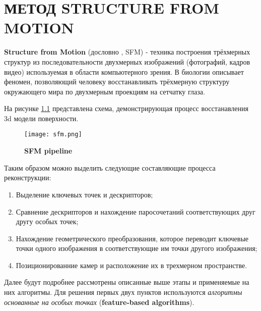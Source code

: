 \chapter{МЕТОД STRUCTURE FROM MOTION}

\textbf{Structure from Motion} (дословно , SFM) - техника построения трёхмерных структур из последовательности двухмерных изображений (фотографий, кадров видео) используемая в области компьютерного зрения. В биологии описывает феномен, позволяющий человеку восстанавливать трёхмерную структуру окружающего мира по двухмерным проекциям на сетчатку глаза.

На рисунке \ref{fig:sfm} представлена схема, демонстрирующая процесс восстанавления 3d модели поверхности.

\begin{figure}[h]
    \centering
    \texttt{[image: sfm.png]}
    \caption{\textbf{SFM pipeline}}
    \label{fig:sfm}
\end{figure}

Таким образом можно выделить следующие составляющие процесса реконструкции: 

\begin{enumerate}
    \item Выделение ключевых точек и дескрипторов;
    \item Сравнение дескрипторов и нахождение паросочетаний соответствующих друг другу особых точек;
    \item Нахождение геометрического преобразования, которое переводит ключевые точки одного изображения в соответствующие им точки другого изображения;
    \item Позиционированние камер и расположение их в трехмерном пространстве.
\end{enumerate}

Далее будут подробнее рассмотрены описанные выше этапы и применяемые на них алгоритмы. Для решения первых двух пунктов используются \textit{алгоритмы основанные на особых точках} (\textbf{feature-based algorithms}).
